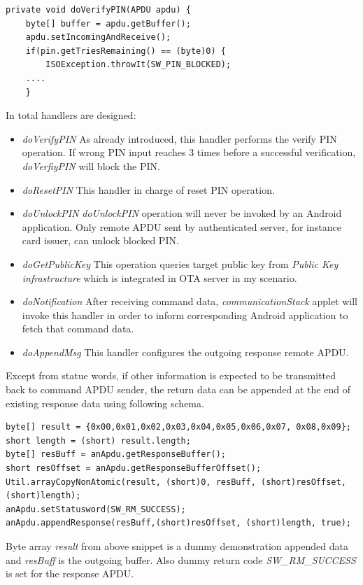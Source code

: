 \begin{Verbatim}[fontsize=\relsize{-1}, frame=lines,framesep=4mm, label=\fbox{\small\emph{doVerifyPIN Handler}}]
private void doVerifyPIN(APDU apdu) {
	byte[] buffer = apdu.getBuffer();
	apdu.setIncomingAndReceive();			
	if(pin.getTriesRemaining() == (byte)0) {
		ISOException.throwIt(SW_PIN_BLOCKED);	
	....
	}
\end{Verbatim}
In total handlers are designed:
\begin{itemize}
\item \emph{doVerifyPIN} As already introduced, this handler performs the verify PIN operation. If wrong PIN input reaches 3 times before a successful verification, \emph{doVerfiyPIN} will block the PIN.
\item \emph{doResetPIN} This handler in charge of reset PIN operation.
\item \emph{doUnlockPIN} \emph{doUnlockPIN} operation will never be invoked by an Android application. Only remote APDU sent by authenticated server, for instance card issuer, can unlock blocked PIN.
\item \emph{doGetPublicKey} This operation queries target public key from \emph{Public Key infrastructure} which is integrated in OTA server in my scenario.
\item \emph{doNotification} After receiving command data, \emph{communicationStack} applet will invoke this handler in order to inform corresponding Android application to fetch that command data. 
\item \emph{doAppendMsg} This handler configures the outgoing response remote APDU.
\end{itemize}
Except from statue words, if other information is expected to be transmitted back to command APDU sender,  the return data can be appended at the end of existing response data using following schema.

\begin{Verbatim}[fontsize=\relsize{-1}, frame=lines,framesep=4mm, label=\fbox{\small\emph{Editing Response Data}}]
byte[] result = {0x00,0x01,0x02,0x03,0x04,0x05,0x06,0x07, 0x08,0x09};
short length = (short) result.length;
byte[] resBuff = anApdu.getResponseBuffer(); 
short resOffset = anApdu.getResponseBufferOffset();
Util.arrayCopyNonAtomic(result, (short)0, resBuff, (short)resOffset, (short)length);	    
anApdu.setStatusword(SW_RM_SUCCESS);
anApdu.appendResponse(resBuff,(short)resOffset, (short)length, true);
\end{Verbatim}

Byte array \emph{result} from above snippet is a dummy demonstration appended data and \emph{resBuff} is the outgoing buffer. Also dummy return code \emph{SW\_RM\_SUCCESS} is set for the response APDU.

